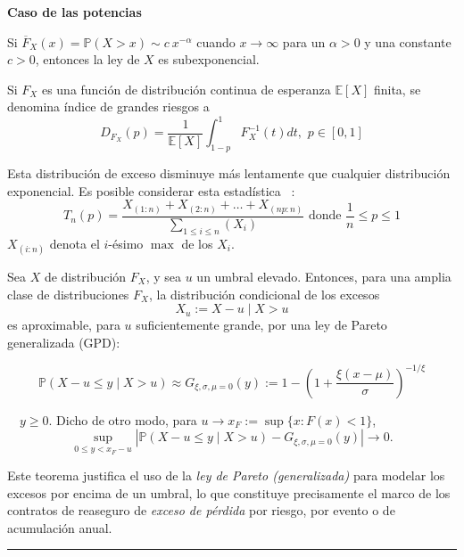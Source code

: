 \begin{f}
	
	\textbf{Caso de las potencias} 
	
	Si \(\overline{F}_{X}(x)=\mathbb{P}(X > x)\sim c\ x^{-\alpha}\)
	cuando \(x \to \infty \) para un \(\alpha > 0 \) y una constante \(c > 0 \), entonces la ley de \(X\)
	es subexponencial.
	
	Si \(F_X\) es una función de distribución continua de esperanza \(\mathbb{E}[X]\) finita, se denomina índice de grandes riesgos a
	\[
	D_{F_X}(p)=\frac{1}{\mathbb{E}[X]}\int_{1-p}^{1} F_X^{-1}(t)dt,\, \, p\in [0,1]
	\]
	
	Esta distribución de exceso disminuye más lentamente que cualquier distribución exponencial.
	Es posible considerar esta estadística ~:
	\[
	T_n(p)=\frac{X_{(1:n)}+X_{(2:n)}+\ldots + X_{(np:n)}}{\sum_{1\leq i\leq n}(X_i)} \mbox{ donde } \frac{1}{n}\leq p\leq 1
	\]
	\(X_{(i:n)}\) denota el \(i\)-ésimo \(\max\) de los \(X_i\).
	
\end{f}
\begin{f}
	Sea \(X\) de distribución \(F_X\), y sea \(u\) un umbral elevado. Entonces, para una amplia clase de distribuciones \(F_X\), la distribución condicional de los excesos
	\[
	X_u := X - u \mid X > u
	\]
	es aproximable, para \(u\) suficientemente grande, por una ley de Pareto generalizada (GPD):
	
	\[
	\mathbb{P}(X - u \le y \mid X > u) \approx G_{\xi, \sigma, \mu=0}(y) :=  1 - \left(1+ \frac{\xi(x-\mu)}{\sigma}\right)^{-1/\xi} 
	\]
	
	\(\quad y \ge 0\). Dicho de otro modo, para \(u \to x_F := \sup\{x : F(x) < 1\}\),
	\[
	\sup_{0 \le y < x_F - u} \left| \mathbb{P}(X - u \le y \mid X > u) - G_{\xi,\sigma,\mu=0}(y) \right| \to 0.
	\]
	
	Este teorema justifica el uso de la \textit{ley de Pareto (generalizada)} para modelar los excesos por encima de un umbral, lo que constituye precisamente el marco de los contratos de reaseguro de \textit{exceso de pérdida} por riesgo, por evento o de acumulación anual. 
\end{f}
\hrule


